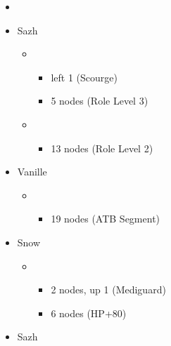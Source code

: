 \begin{menu}
	\begin{itemize}
		\paradigm
		\begin{itemize}
			\item {}%
				  {\paradigmline{(\rav)}{(\rav)}{\sen}}%
			      {\paradigmline{(\rav)}{\rav}{(\rav)}}%
			      {\paradigmline[4]{\syn}{(\med)}{\com}}%
			      {\paradigmline{(\rav)}{\sab}{(\rav)}}%
			      {\paradigmline{\com}{(\rav)}{\com}}%
			      {\paradigmline{\com}{\sab}{\sen}}
		\end{itemize}
		\crystarium
		\begin{itemize}
			\item Sazh
				\begin{itemize}
					\item \com
						\begin{itemize}
							\item left 1 (Scourge)
							\item 5 nodes (Role Level 3)
						\end{itemize}
					\item \rav
						\begin{itemize}
							\item 13 nodes (Role Level 2)
						\end{itemize}
				\end{itemize}
			\item Vanille
				\begin{itemize}
					\item \med
						\begin{itemize}
							\item 19 nodes (ATB Segment)
						\end{itemize}
				\end{itemize}
			\item Snow
				\begin{itemize}
					\item \sen
						\begin{itemize}
							\item 2 nodes, up 1 (Mediguard)
							\item 6 nodes (HP+80)
						\end{itemize}
				\end{itemize}
		\end{itemize}
		\equip
		\begin{itemize}
			\item Sazh
				\begin{itemize}

\end{itemize}
\end{itemize}
\end{itemize}
\end{menu}
